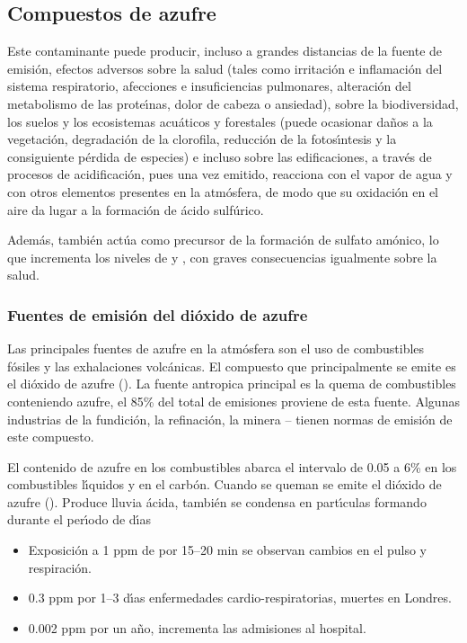 \subsection{Compuestos de azufre}
Este contaminante puede producir, incluso a grandes distancias de la fuente de emisi\'on, efectos adversos sobre la salud (tales como irritaci\'on e inflamaci\'on del sistema respiratorio, afecciones e insuficiencias pulmonares, alteraci\'on del metabolismo de las prote\'{\i}nas, dolor de cabeza o ansiedad), sobre la biodiversidad, los suelos y los ecosistemas acu\'aticos y forestales (puede ocasionar da\~nos a la vegetaci\'on, degradaci\'on de la clorofila, reducci\'on de la fotos\'{\i}ntesis y la consiguiente p\'erdida de especies) e incluso sobre las edificaciones, a trav\'es de procesos de acidificaci\'on, pues una vez emitido, reacciona con el vapor de agua y con otros elementos presentes en la atm\'osfera, de modo que su oxidaci\'on en el aire da lugar a la formaci\'on de \'acido sulf\'urico.

Adem\'as, tambi\'en act\'ua como precursor de la formaci\'on de sulfato am\'onico, lo que incrementa los niveles de  y , con graves consecuencias igualmente sobre la salud.

\subsubsection{Fuentes de emisi\'on del di\'oxido de azufre} Las principales fuentes de azufre en la atm\'osfera son el uso de combustibles f\'osiles y las exhalaciones volc\'anicas. El compuesto que principalmente se emite es el di\'oxido de azufre (). La fuente  \gls{antropica} principal es la quema de combustibles conteniendo azufre, el 85\% del total de emisiones proviene de esta fuente. Algunas industrias de la fundici\'on, la refinaci\'on, la minera --  tienen normas de emisi\'on de este compuesto.

El contenido de azufre en los combustibles abarca el intervalo de 0.05 a 6\% en los combustibles l\'{\i}quidos y en el carb\'on. Cuando se queman se emite el di\'oxido de azufre ().
Produce lluvia \'acida, tambi\'en se condensa en part\'{\i}culas formando  durante el per\'{\i}odo de d\'{\i}as
\begin{itemize}
\item Exposici\'on a 1 ppm de  por 15--20 min se observan cambios en el pulso y
respiraci\'on.
\item 0.3 ppm por 1--3 d\'{\i}as enfermedades cardio-respiratorias, muertes en Londres.
\item 0.002 ppm por un a\~no, incrementa las admisiones al hospital.
\end{itemize}

